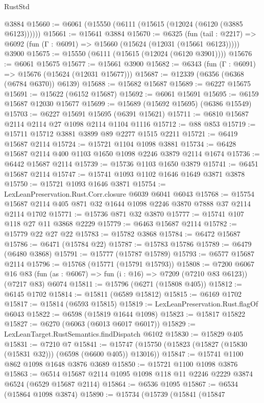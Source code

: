 \begin{lexlean}{RustStd}
\begin{coremodule}
    @3884
@15660 := @6061 (@15550 (@6111 (@15615 (@12024 (@6120 (@3885 @6123))))))
@15661 := @15641 @3884
@15670 := @6325
    (fun (tail : @2217) => @6092 (fun (Γ : @6091) => @15660 (@15624 (@12031 (@15661 @6123)))))
    @3900
@15675 := @15550 (@6111 (@15615 (@12024 (@6120 @3901))))
@15676 := @6061 @15675
@15677 := @15661 @3900
@15682 := @6343 (fun (Γ : @6091) => @15676 (@15624 (@12031 @15677)))
@15687 := @12339 (@6356 (@6368 (@6784 @6370)) @6139)
@15688 := @15682 @15687
@15689 := @6227 @15675
@15691 := @15622 (@6152 @15687)
@15692 := @6061 @15691
@15695 := @6159 @15687 @12030 @15677
@15699 := @15689 (@15692 @15695) (@6386 @15549)
@15703 := @6227 @15691 @15695 (@6391 @15621)
@15711 := @6810 @15687 @2114 @2114 @27 @1098 @2114 @1104 @1116
@15712 := @88 @853
@15719 := @15711 @15712 @3881 @3899 @89 @2277 @1515 @2211
@15721 := @6419 @15687 @2114
@15724 := @15721 @1104 @1098 @3881
@15734 := @6428 @15687 @2114 @400 @1103 @1650 @1098 @2246 @3879 @2114 @1674
@15736 := @6442 @15687 @2114
@15739 := @15736 @1103 @1650 @3879
@15741 := @6451 @15687 @2114
@15747 := @15741 @1093 @1102 @1646 @1649 @3871 @3878
@15750 := @15721 @1093 @1646 @3871
@15754 := LexLeanPreservation.Rust.Corr.closure @6039 @6041 @6043
@15768 := @15754 @15687 @2114 @405 @871 @32 @1644 @1098 @2246 @3870 @7888 @37 @2114 @2114 @1702
@15771 := @15736 @871 @32 @3870
@15777 := @15741 @107 @118 @27 @11 @3868 @2229
@15779 := @6463 @15687 @2114
@15782 := @15779 @22 @27 @22
@15783 := @15782 @3868
@15784 := @6472 @15687
@15786 := @6471 (@15784 @22)
@15787 := @15783 @15786
@15789 := @6479 (@6480 @3868)
@15791 := @15777 (@15787 @15789)
@15793 := @6577 @15687 @2114
@15796 := @15768 (@15771 (@15791 @15793))
@15808 := @7200
    @6067
    @16
    @83
    (fun (as : @6067) => fun (i : @16) => @7209 (@7210 @83 @6123))
    (@7217 @83)
    @6074
@15811 := @15796 (@6271 (@15808 @405))
@15812 := @6145 @1702
@15814 := @15811 (@6589 @15812)
@15815 := @6169 @1702
@15817 := @15814 (@6593 @15815)
@15819 := LexLeanPreservation.Rust.flagOf @6043
@15822 := @6598 (@15819 @1644 @1098)
@15823 := @15817 @15822
@15827 := @6270 (@6063 (@6013 @6017 @6017))
@15829 := LexLeanTarget.RustSemantics.findDispatch @6102
@15830 := @15829 @405
@15831 := @7210 @7
@15841 := @15747 (@15750 (@15823 (@15827 (@15830 (@15831 @32))) (@6598 (@6600 @405)) @13016))
@15847 := @15741 @1100 @862 @1098 @1648 @3876 @3689
@15850 := @15721 @1100 @1098 @3876
@15863 := @6514 @15687 @2114 @1095 @1098 @118 @11 @2246 @2229 @3874 @6524 (@6529 @15687 @2114)
@15864 := @6536 @1095
@15867 := @6534 (@15864 @1098 @3874)
@15890 := @15734
    (@15739
      (@15841
        (@15847

\end{coremodule}
\end{lexlean}
